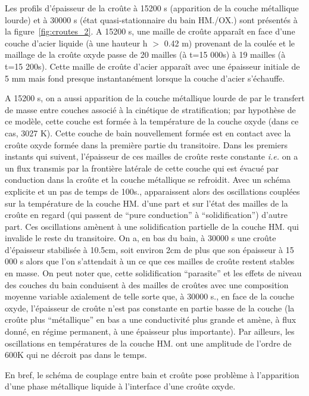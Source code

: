 Les profils d'épaisseur de la croûte à 15200 s (apparition de la couche métallique lourde) et à 30000 s (état quasi-stationnaire du bain HM./OX.) sont présentés à la figure~\ref{fig:croutes_2}.
A 15200 s, une maille de croûte apparaît en face d'une couche d'acier liquide (à une hauteur h $>$ 0.42 m) provenant de la coulée et le maillage de la croûte oxyde passe de 20 mailles (à t=15 000s) à 19 mailles (à t=15 200s). Cette maille de croûte d'acier apparaît avec une épaisseur initiale de 5 mm mais fond presque instantanément lorsque la couche d'acier s'échauffe. 

A 15200 s, on a aussi apparition de la couche métallique lourde de par le transfert de masse entre couches associé à la cinétique de stratification; par hypothèse de ce modèle, cette couche est formée à la température de la couche oxyde (dans ce cas, 3027 K). Cette couche de bain nouvellement formée est en contact avec la croûte oxyde formée dans la première partie du transitoire. Dans les premiers instants qui suivent, l'épaisseur de ces mailles de croûte reste constante \textit{i.e.} on a un flux transmis par la frontière latérale de cette couche qui est évacué par conduction dans la croûte et la couche métallique se refroidit. Avec un schéma explicite et un pas de temps de 100s., apparaissent alors des oscillations couplées sur la température de la couche HM. d'une part et sur l'état des mailles de la croûte en regard (qui passent de ``pure conduction'' à ``solidification'') d'autre part. Ces oscillations amènent à une solidification partielle de la couche HM. qui invalide le reste du transitoire. On a, en bas du bain, à 30000 s une croûte d'épaisseur stabilisée à 10.5cm, soit environ 2cm de plus que son épaisseur à 15 000 s alors que l'on s'attendait à un ce que ces mailles de croûte restent stables en masse. On peut noter que, cette solidification ``parasite'' et les effets de niveau des couches du bain conduisent à des mailles de croûtes avec une composition moyenne variable axialement de telle sorte que, à 30000 s., en face de la couche oxyde, l'épaisseur de croûte n'est pas constante en partie basse de la couche (la croûte plus ``métallique'' en bas a une conductivité plus grande et amène, à flux donné, en régime permanent, à une épaisseur plus importante). Par ailleurs, les oscillations en températures de la couche HM. ont une amplitude de l'ordre de 600K qui ne décroit pas dans le temps.

En bref, le schéma de couplage entre bain et croûte pose problème à l'apparition d'une phase métallique liquide à l'interface d'une croûte oxyde.

